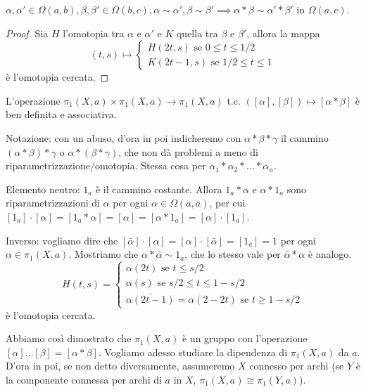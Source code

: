 \begin{lm}
  $\alpha, \alpha' \in \Omega(a, b), \beta, \beta' \in \Omega(b, c), \alpha \sim \alpha', \beta \sim \beta' \implies \alpha * \beta \sim \alpha' * \beta'$ in $\Omega(a, c)$.
\end{lm}

\begin{proof}
  Sia $H$ l'omotopia tra $\alpha$ e $\alpha'$ e $K$ quella tra $\beta$ e $\beta'$, allora la mappa
  $$(t, s) \mapsto \begin{cases} H(2t, s) \text{ se } 0 \le t \le 1/2 \\ K(2t-1, s) \text{ se } 1/2 \le t \le 1 \end{cases}$$ è l'omotopia cercata.
\end{proof}

\begin{cor}
  L'operazione $\pi_1(X, a) \times \pi_1(X, a) \rightarrow \pi_1(X, a)$ t.c. $([\alpha], [\beta]) \mapsto [\alpha * \beta]$ è ben definita e associativa.
\end{cor}

Notazione: con un abuso, d'ora in poi indicheremo con $\alpha * \beta * \gamma$ il cammino $(\alpha * \beta) * \gamma$ o $\alpha * (\beta * \gamma)$, che non dà problemi a meno di riparametrizzazione/omotopia. Stessa cosa per $\alpha_1 * \alpha_2 * \dots * \alpha_n$.

Elemento neutro: $1_a$ è il cammino costante. Allora $1_a * \alpha$ e $\alpha * 1_a$ sono riparametrizzazioni di $\alpha$ per ogni $\alpha \in \Omega(a, a)$, per cui $[1_a]\cdot[\alpha]=[1_a * \alpha]=[\alpha]=[\alpha * 1_a]=[\alpha]\cdot[1_a]$.

Inverso: vogliamo dire che $[\bar{\alpha}]\cdot[\alpha]=[\alpha]\cdot[\bar{\alpha}]=[1_a]=1$ per ogni $\alpha \in \pi_1(X, a)$. Mostriamo che $\alpha * \bar{\alpha} \sim 1_a$, che lo stesso vale per $\bar{\alpha} * \alpha$ è analogo.
$$H(t, s)=\begin{cases} \alpha(2t) \text{ se } t \le s/2 \\ \alpha(s) \text{ se } s/2 \le t \le 1-s/2 \\ \bar{\alpha(2t-1)}=\alpha(2-2t) \text{ se } t \ge 1-s/2 \end{cases}$$ è l'omotopia cercata.

Abbiamo così dimostrato che $\pi_1(X, a)$ è un gruppo con l'operazione $[\alpha]\dots[\beta]=[\alpha * \beta]$. Vogliamo adesso studiare la dipendenza di  $\pi_1(X, a)$ da $a$. D'ora in poi, se non detto diversamente, assumeremo $X$ connesso per archi (se $Y$ è la componente connessa per archi di $a$ in $X$, $\pi_1(X,a ) \cong \pi_1(Y, a)$).

